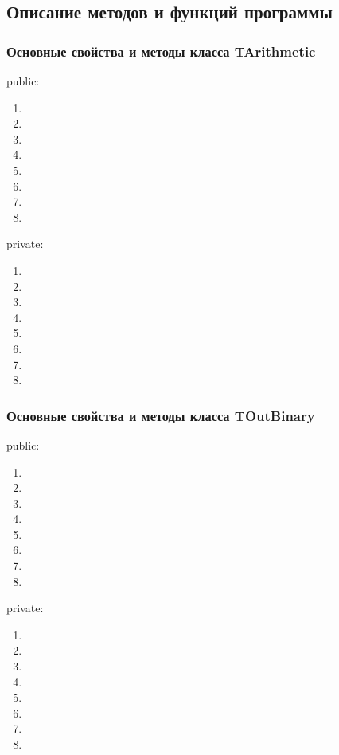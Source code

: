 \documentclass[12pt]{article}
\begin{document}
\subsection*{Описание методов и функций программы}
 
\subsubsection*{Основные свойства и методы класса TArithmetic}%
\noindent
public:

\begin{enumerate}
	\item 
	\item 
	\item 
	\item 
	\item 
	\item 
	\item 
	\item 
\end{enumerate}
\noindent
private:

\begin{enumerate}
	\item 
	\item 
	\item 
	\item 
	\item 
	\item 
	\item 
	\item 
\end{enumerate}

\subsubsection*{Основные свойства и методы класса TOutBinary}%
\noindent
public:

\begin{enumerate}
	\item 
	\item 
	\item 
	\item 
	\item 
	\item 
	\item 
	\item 
\end{enumerate}
\noindent
private:

\begin{enumerate}
	\item 
	\item 
	\item 
	\item 
	\item 
	\item 
	\item 
	\item 
\end{enumerate}
\end{document}
